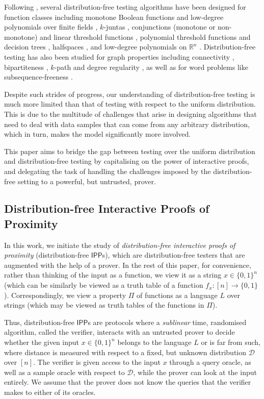 \documentclass[10pt,a4paper]{article}
\newcommand{\IPP}{\mathsf{IPP}}
\newcommand{\R}{\mathbb{R}}
\newcommand{\sD}{\mathcal{D}}
\begin{document}
Following \cite{GGR98}, several distribution-free testing algorithms have been designed for function classes including monotone Boolean functions and low-degree polynomials over finite fields \cite{HalKush}, $k$-juntas \cite{LCSSX18,bshouty19,Belovs19}, conjunctions (monotone or non-monotone) and linear threshold functions \cite{GlasServ, ChenXie}, polynomial threshold functions and decision trees \cite{BFM21}, halfspaces \cite{BFM21,XP22}, and low-degree polynomials on $\R^n$ \cite{dflin,ABFKY23}. Distribution-free testing has also been studied for graph properties including connectivity \cite{HK08}, bipartiteness \cite{goldreich_biparite}, $k$-path and degree regularity \cite{goldreich_2019_graphtest}, as well as for word problems like subsequence-freeness \cite{RR22}.

Despite such strides of progress, our understanding of distribution-free testing is much more limited than that of testing with respect to the uniform distribution. This is due to the multitude of challenges that arise in designing algorithms that need to deal with data samples that can come from any arbitrary distribution, which in turn, makes the model significantly more involved.

This paper aims to bridge the gap between testing over the uniform distribution and distribution-free testing by capitalising on the power of interactive proofs, and delegating the task of handling the challenges imposed by the distribution-free setting to a powerful, but untrusted, prover.

\subsection{Distribution-free Interactive Proofs of Proximity}
\label{sec:dfipps_motivate}
In this work, we initiate the study of \textit{distribution-free interactive proofs of proximity} (distribution-free $\IPP$s), which are distribution-free testers that are augmented with the help of a prover. In the rest of this paper, for convenience, rather than thinking of the input as a function, we view it as a string $x \in \{0,1\}^{n}$ (which can be similarly be viewed as a truth table of a function $f_x : [n] \to \{0,1\}$). Correspondingly, we view a property $\Pi$ of functions as a language $L$ over strings (which may be viewed as truth tables of the functions in $\Pi$).

Thus, distribution-free $\IPP$s are protocols where a \textit{sublinear} time, randomised algorithm, called the verifier, interacts with an untrusted prover to decide whether the given input $x \in \{0,1\}^n$ belongs to the language $L$ or is far from such, where distance is measured with respect to a fixed, but unknown distribution $\sD$ over $[n]$. The verifier is given access to the input $x$ through a query oracle, as well as a sample oracle with respect to $\sD$, while the prover can look at the input entirely. We assume that the prover does not know the queries that the verifier makes to either of its oracles.
\end{document}
